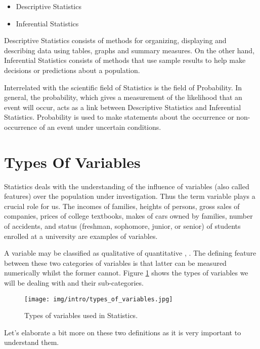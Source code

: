 \begin{itemize}
\item Descriptive Statistics
\item Inferential Statistics
\end{itemize}

Descriptive Statistics consists of methods for organizing, displaying and describing data using tables, graphs and summary measures. On the other hand, Inferential Statistics consists of methods that use sample results to help make decisions or predictions about a population.

Interrelated  with the scientific field of Statistics is the field of Probability. In general, the probability, which gives a measurement of the likelihood that an event will occur, acts as a link between Descriptive Statistics and Inferential Statistics.
Probability is used to make statements about the occurrence or non-occurrence of an event under uncertain conditions.

\section{Types Of Variables}
\label{types_variables}
Statistics deals with the understanding of the influence of variables (also called features) over the population under investigation. Thus the term variable plays a crucial role  for us. The incomes of families, heights of persons, gross sales
of companies, prices of college textbooks, makes of cars owned by families, number of accidents, and status (freshman, sophomore, junior, or senior) of students enrolled at a university are examples of variables. 

A variable may be classified as qualitative of quantitative \cite{Mann2010}, \cite{Tsimbos1999}. The defining feature between these two categories of variables is that latter can be measured numerically whilst the former cannot. Figure \ref{types_of_variables} shows the types of variables we will be dealing with and their sub-categories.

\begin{figure}[!htb]
\begin{center}
\texttt{[image: img/intro/types\_of\_variables.jpg]}
\end{center}
\caption{Types of variables used in Statistics.}
\label{types_of_variables}
\end{figure}


 Let's elaborate a bit more on these two definitions as it is very important to understand them.

